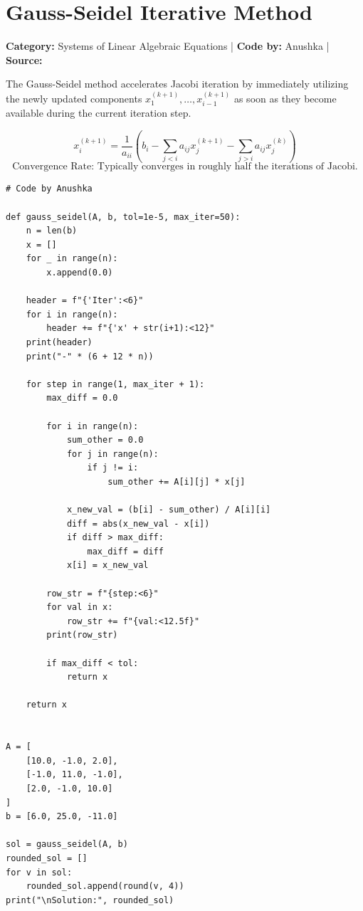 \documentclass[10pt,a4paper]{report}
\begin{document}
\newpage

\section{Gauss-Seidel Iterative Method}
\textbf{Category:} \textcolor{secondary}{Systems of Linear Algebraic Equations} \quad | \quad \textbf{Code by:} \textcolor{secondary}{Anushka} \quad | \quad \textbf{Source:} \texttt{}

The Gauss-Seidel method accelerates Jacobi iteration by immediately utilizing the newly updated components $x_1^{(k+1)}, \dots, x_{i-1}^{(k+1)}$ as soon as they become available during the current iteration step.

\begin{tcolorbox}[colback=theorybg,colframe=theoryframe,title=\textbf{Mathematical Theory \& Formulation},boxrule=1pt,arc=2mm]
\[
x_i^{(k+1)} = \frac{1}{a_{ii}}\left(b_i - \sum_{j < i} a_{ij} x_j^{(k+1)} - \sum_{j > i} a_{ij} x_j^{(k)}\right)
\]
\[
\text{Convergence Rate: Typically converges in roughly half the iterations of Jacobi.}
\]
\end{tcolorbox}

\begin{tcolorbox}[colback=codebg,colframe=secondary,title=\textbf{Python Implementation (Step-by-Step Loops \& Pure Functions)},boxrule=1pt,arc=2mm]
\begin{lstlisting}[style=python_detailed]
# Code by Anushka

def gauss_seidel(A, b, tol=1e-5, max_iter=50):
    n = len(b)
    x = []
    for _ in range(n):
        x.append(0.0)

    header = f"{'Iter':<6}"
    for i in range(n):
        header += f"{'x' + str(i+1):<12}"
    print(header)
    print("-" * (6 + 12 * n))

    for step in range(1, max_iter + 1):
        max_diff = 0.0

        for i in range(n):
            sum_other = 0.0
            for j in range(n):
                if j != i:
                    sum_other += A[i][j] * x[j]

            x_new_val = (b[i] - sum_other) / A[i][i]
            diff = abs(x_new_val - x[i])
            if diff > max_diff:
                max_diff = diff
            x[i] = x_new_val

        row_str = f"{step:<6}"
        for val in x:
            row_str += f"{val:<12.5f}"
        print(row_str)

        if max_diff < tol:
            return x

    return x


A = [
    [10.0, -1.0, 2.0],
    [-1.0, 11.0, -1.0],
    [2.0, -1.0, 10.0]
]
b = [6.0, 25.0, -11.0]

sol = gauss_seidel(A, b)
rounded_sol = []
for v in sol:
    rounded_sol.append(round(v, 4))
print("\nSolution:", rounded_sol)

\end{lstlisting}
\end{tcolorbox}
\end{document}
